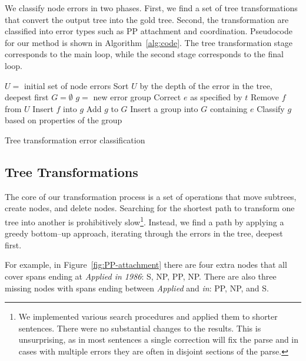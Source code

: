 We classify node errors in two phases.  First, we find a set of tree
transformations that convert the output tree into the gold tree.  Second, the
transformation are classified into error types such as PP attachment and
coordination.  Pseudocode for our method is shown in Algorithm~\ref{alg:code}.
The tree transformation stage corresponds to the main loop, while the second
stage corresponds to the final loop.

\begin{algorithm}[t]
\begin{algorithmic}
\State $U =$ initial set of node errors
\State Sort $U$ by the depth of the error in the tree, deepest first
\State $G = \emptyset$
\Repeat
			\State $g =$ new error group
			\State Correct $e$ as specified by $t$
				\State Remove $f$ from $U$
				\State Insert $f$ into $g$
			\EndFor
			\State Add $g$ to $G$
		\EndIf
	\EndFor
{}
	\State Insert a group into $G$ containing $e$
\EndFor
{}
	\State Classify $g$ based on properties of the group
\EndFor
\end{algorithmic}
\caption{ \label{alg:code}
	Tree transformation error classification
}
\end{algorithm}

\subsection{Tree Transformations}

The core of our transformation process is a set of operations that move
subtrees, create nodes, and delete nodes.  Searching for the shortest path to
transform one tree into another is prohibitively slow\footnote{We implemented
various search procedures and applied them to shorter sentences. There were no substantial changes to the results. This is unsurprising, as in most sentences a single correction will fix the parse and in cases with multiple errors they are often in disjoint sections of the parse.}.
Instead, we find a path by applying a greedy bottom--up approach, iterating through the errors in the tree, deepest first.

For example, in Figure~\ref{fig:PP-attachment} there are four extra
nodes that all cover spans ending at \emph{Applied in 1986}: S, NP, PP, NP.
There are also three missing nodes with spans ending between \emph{Applied} and
\emph{in}: PP, NP, and S.

